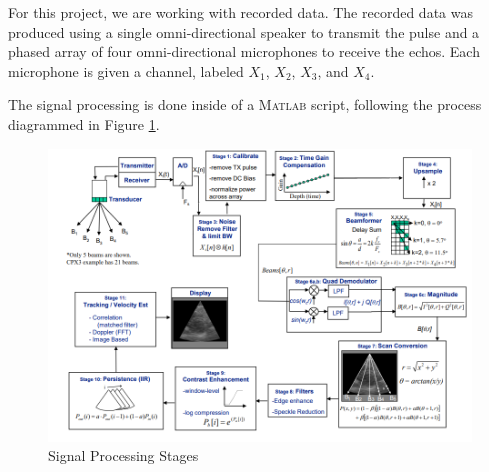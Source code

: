 For this project, we are working with recorded data.  The recorded data was produced using a single omni-directional speaker to transmit the pulse and a phased array of four omni-directional microphones to receive the echos.  Each microphone is given a channel, labeled $X_1$, $X_2$, $X_3$, and $X_4$.

The signal processing is done inside of a \textsc{Matlab} script, following the process diagrammed in Figure \ref{fig:stages}. 

\begin{figure}[H]
    \centering
    \includegraphics[width=0.75\linewidth]{figures/stages.png}
    \caption{Signal Processing Stages}
    \label{fig:stages}
\end{figure}
